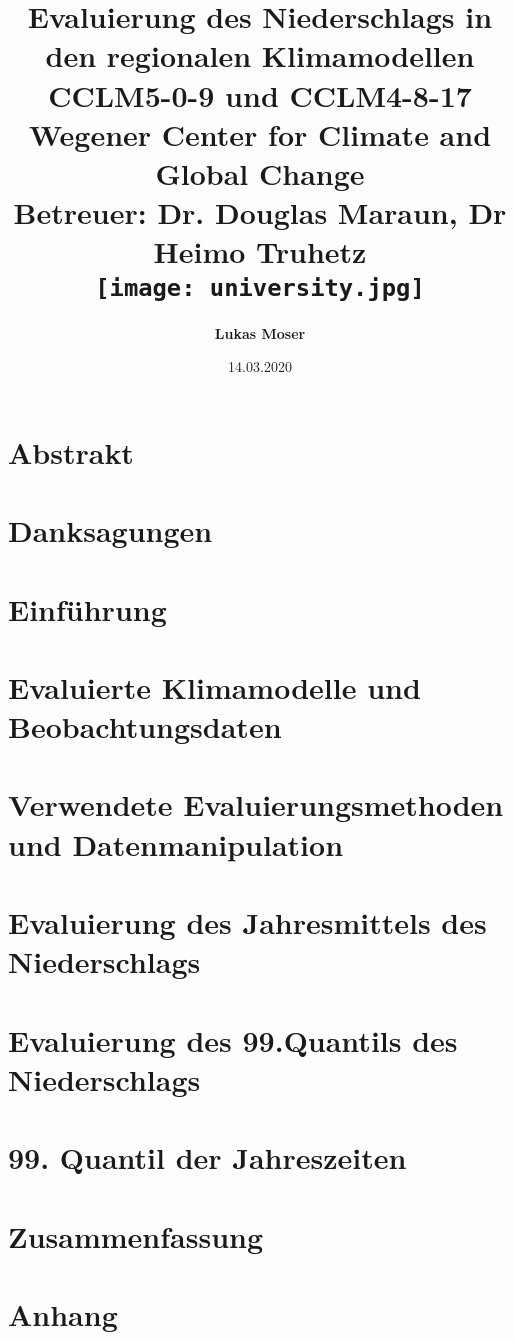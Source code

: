 \documentclass[12pt,twoside]{report}
\title{
	{\textbf{Evaluierung des Niederschlags in den regionalen Klimamodellen CCLM5-0-9 und CCLM4-8-17}}\\
	\vspace{20pt}
	{\Large Wegener Center for Climate and Global Change}\\
	{\large Betreuer: Dr. Douglas Maraun, Dr Heimo Truhetz}\\
	\vspace{20pt}
	{\texttt{[image: university.jpg]}}\\
}
\author{\Large{\textbf{Lukas Moser}}}
\date{14.03.2020}
\begin{document}
	\maketitle

	
	\chapter*{Abstrakt}
	
	
	\chapter*{Danksagungen}
	
	\newpage
	\tableofcontents
	
	\chapter{Einführung}
	\label{chap:intro}
	
	
	\chapter{Evaluierte Klimamodelle und Beobachtungsdaten}
	\label{chap:modells}
	
	
	\chapter{Verwendete Evaluierungsmethoden und Datenmanipulation}
	\label{chap:methods}
	
	
	\chapter{Evaluierung des Jahresmittels des Niederschlags}
	\label{chap:mean}
	
	
	\chapter{Evaluierung des 99.Quantils des Niederschlags}
	\label{chap:quantile}
	
	
	\chapter{99. Quantil der Jahreszeiten}
	\label{chap:quantile_seasons}
	
	
	\chapter{Zusammenfassung}
	\label{chap:conclusion}
	
	
	\appendix
		\bgroup
		\titleformat{\chapter}{}{}{0pt}{\normalfont\Large\bfseries}
		\titlespacing*{\chapter}{0pt}{0pt}{20pt}
		\chapter{Anhang}
		
		
	\egroup
	\printbibliography[title=Referenzen]
\end{document}
